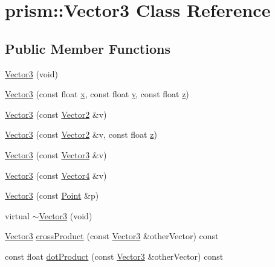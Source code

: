 \hypertarget{classprism_1_1_vector3}{}\section{prism\+:\+:Vector3 Class Reference}
\label{classprism_1_1_vector3}
\subsection*{Public Member Functions}
\begin{DoxyCompactItemize}
\item 
\hyperlink{classprism_1_1_vector3_a4c8a967a3ad35433d940835da86951be}{Vector3} (void)
\item 
\hyperlink{classprism_1_1_vector3_a5a9ce22b6f76fa0b19b0f2a452120ebe}{Vector3} (const float \hyperlink{classprism_1_1_vector3_a6cd6b0776fc0eae2068f2610b882bb9f}{x}, const float \hyperlink{classprism_1_1_vector3_ad1e152047e314b334b4ccb5ab665640c}{y}, const float \hyperlink{classprism_1_1_vector3_af760dbfa2ae9747794f1a542395306b8}{z})
\item 
\hyperlink{classprism_1_1_vector3_a478e2dba2c1bd6cb5d319e293d76bd74}{Vector3} (const \hyperlink{classprism_1_1_vector2}{Vector2} \&v)
\item 
\hyperlink{classprism_1_1_vector3_ad0b141f676e38dfb7f28a5d36d38e028}{Vector3} (const \hyperlink{classprism_1_1_vector2}{Vector2} \&v, const float \hyperlink{classprism_1_1_vector3_af760dbfa2ae9747794f1a542395306b8}{z})
\item 
\hyperlink{classprism_1_1_vector3_ac01c271a781d04df0bd834c50a0f3cfa}{Vector3} (const \hyperlink{classprism_1_1_vector3}{Vector3} \&v)
\item 
\hyperlink{classprism_1_1_vector3_a69128dd0e0c36e12eae1c7bea75a8729}{Vector3} (const \hyperlink{classprism_1_1_vector4}{Vector4} \&v)
\item 
\hyperlink{classprism_1_1_vector3_a0ca9ab8904b692b589173f485c7f6b7f}{Vector3} (const \hyperlink{classprism_1_1_point}{Point} \&p)
\item 
virtual \hyperlink{classprism_1_1_vector3_a2bbff2a24413343add18e58de51a4056}{$\sim$\+Vector3} (void)
\item 
\hyperlink{classprism_1_1_vector3}{Vector3} \hyperlink{classprism_1_1_vector3_a1d921241365dbcd6d97ff3f048303774}{cross\+Product} (const \hyperlink{classprism_1_1_vector3}{Vector3} \&other\+Vector) const 
\item 
const float \hyperlink{classprism_1_1_vector3_a8ce2bae07d8ac9f088fed29ed036cbd1}{dot\+Product} (const \hyperlink{classprism_1_1_vector3}{Vector3} \&other\+Vector) const 

\end{DoxyCompactItemize}

